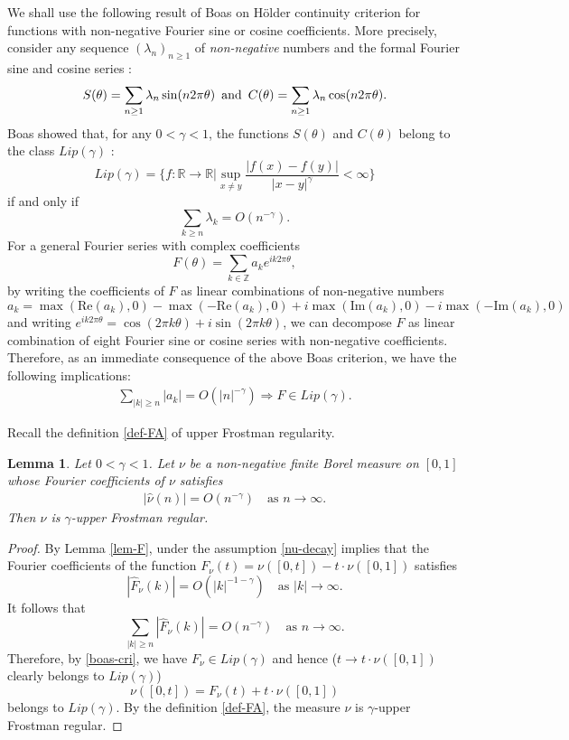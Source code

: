 \documentclass[12pt]{amsart}
\newtheorem{lemma}[theorem]{Lemma}
\theoremstyle{definition}
\theoremstyle{remark}
\newcommand{\R}{\mathbb{R}}
\newcommand{\Z}{\mathbb{Z}}
\newcommand{\an}{\text{\, and \,}}
\numberwithin{equation}{section}
\begin{document}
We shall use the following result  of  Boas \cite[Theorem 1]{Boa67} on H\"older continuity criterion for functions with non-negative  Fourier sine or cosine coefficients.  More precisely, consider any sequence $(\lambda_n)_{n\ge 1}$ of {\it non-negative} numbers and the formal Fourier sine and cosine series :
\[
S(\theta) = \sum_{n\ge 1} \lambda_n \sin(n 2 
\pi  \theta) \an C(\theta)= \sum_{n\ge 1} \lambda_n \cos(n 2 \pi \theta). 
\] 
Boas showed that, for any $0< \gamma< 1$, the functions $S(\theta)$ and   $C(\theta)$  belong to the class $Lip(\gamma)$ : 
\[
Lip(\gamma)= \Big\{  f: \R\rightarrow \R\Big |   \sup_{x\ne y} \frac{|f(x)-f(y)|}{|x-y|^\gamma}<\infty \Big\} 
\]
if and only if 
\[
\sum_{k\ge n}\lambda_k = O (n^{-\gamma}). 
\]
For a general  Fourier series with complex coefficients
\[
F(\theta) = \sum_{k \in \Z} a_k e^{i k2 \pi \theta}, 
\]
by writing the coefficients of $F$ as linear combinations of non-negative numbers
\[
a_k =    \max(\mathrm{Re}(a_k), 0)  -  \max(-\mathrm{Re}(a_k), 0)  + i \max(\mathrm{Im}(a_k), 0) - i \max(-\mathrm{Im}(a_k), 0)
\]
and writing $e^{ik 2\pi \theta} = \cos(2\pi k \theta) + i \sin(2\pi k \theta)$,  we can decompose $F$ as linear combination of eight Fourier sine or cosine series with non-negative coefficients. Therefore,  as an immediate consequence of the above  Boas criterion, 
we have the following implications: 
\begin{align}\label{boas-cri}
\sum_{|k|\ge n} |a_k|= O(|n|^{-\gamma})   \Longrightarrow  F\in Lip(\gamma).  
\end{align}

Recall the definition \eqref{def-FA} of upper Frostman regularity. 
\begin{lemma}\label{lem-boas}
Let $0<\gamma<1$. 
Let $\nu$ be a non-negative finite Borel measure on $[0,1]$ whose Fourier coefficients of $\nu$ satisfies 
\begin{align}\label{nu-decay}
| \widehat{\nu}(n)| = O(n^{-\gamma}) \quad \text{as $n\to\infty$}.
\end{align}
Then $\nu$ is $\gamma$-upper Frostman regular. 
\end{lemma}




\begin{proof}
By Lemma \ref{lem-F}, under the assumption \eqref{nu-decay} implies that  the Fourier coefficients of   the function $F_\nu(t)= \nu([0,t]) -   t \cdot \nu([0,1])$ satisfies 
\[
|\widehat{F}_\nu (k)| =  O  (|k|^{-1 - \gamma}) \quad \text{as $|k|\to\infty$}.
\]
It follows that 
\[
\sum_{|k|\ge n} |\widehat{F}_\nu (k)|   = O(n^{-\gamma})  \quad \text{as $n\to\infty$}.
\]
Therefore, by \eqref{boas-cri}, we have $F_\nu \in Lip(\gamma)$ and hence  ($t\to t\cdot \nu([0,1])$ clearly belongs to $Lip(\gamma)$) 
\[
\nu([0,t]) = F_\nu(t) + t \cdot \nu([0,1])
\]
 belongs to $Lip(\gamma)$.  By the definition \eqref{def-FA}, the measure $\nu$ is $\gamma$-upper Frostman regular. 
\end{proof}
\end{document}
